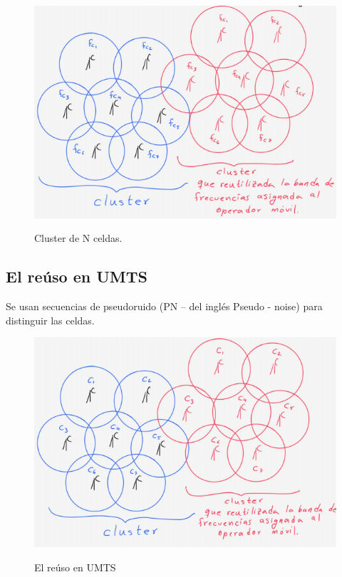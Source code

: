 \vspace{200px}
\begin{figure}[h!]
	\captionsetup{justification = raggedright, singlelinecheck = false}
	\caption{Cluster de N celdas.} 
	\centering
	\includegraphics[scale=1]{Imagenes/Cluster-movil.png}
	\label{fig:Cluster-movil}
\end{figure}

\subsection{El reúso en UMTS}

Se usan secuencias de pseudoruido (PN – del inglés Pseudo - noise) para distinguir las celdas. 

\begin{figure}[h!]
	\captionsetup{justification = raggedright, singlelinecheck = false}
	\caption{El reúso en UMTS} 
	\centering
	\includegraphics[scale=0.7]{Imagenes/FDD.png}
	\label{fig:FDD}
\end{figure}

